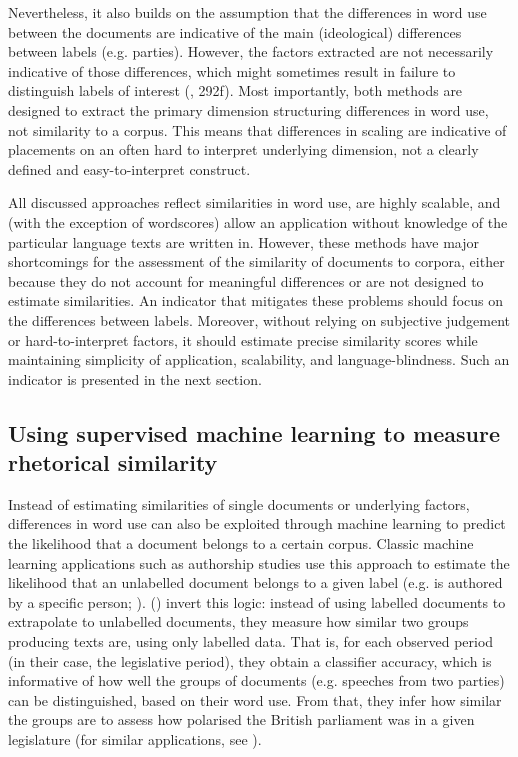 \documentclass{article}
\begin{document}
Nevertheless, it also builds on the assumption that the differences in word use between the documents are indicative of the main (ideological) differences between labels (e.g. parties). However, the factors extracted are not necessarily indicative of those differences, which might sometimes result in failure to distinguish labels of interest (\cite{Grimmer2013TextASData}, 292f). Most importantly, both methods are designed to extract the primary dimension structuring differences in word use, not similarity to a corpus. This means that differences in scaling are indicative of placements on an often hard to interpret underlying dimension, not a clearly defined and easy-to-interpret construct.\par

All discussed approaches reflect similarities in word use, are highly scalable, and (with the exception of wordscores) allow an application without knowledge of the particular language texts are written in. However, these methods have major shortcomings for the assessment of the similarity of documents to corpora, either because they do not account for meaningful differences or are not designed to estimate similarities. An indicator that mitigates these problems should focus on the differences between labels. Moreover, without relying on subjective judgement or hard-to-interpret factors, it should estimate precise similarity scores while maintaining simplicity of application, scalability, and language-blindness. Such an indicator is presented in the next section.\par

\subsection{Using supervised machine learning to measure rhetorical similarity}
\label{sec:method}

Instead of estimating similarities of single documents or underlying factors, differences in word use can also be exploited through machine learning to predict the likelihood that a document belongs to a certain corpus. Classic machine learning applications such as authorship studies use this approach to estimate the likelihood that an unlabelled document belongs to a given label (e.g. is authored by a specific person; \cite{Mosteller1963}). \citeauthor{Peterson2018} (\citeyear{Peterson2018}) invert this logic: instead of using labelled documents to extrapolate to unlabelled documents, they measure how similar two groups producing texts are, using only labelled data. That is, for each observed period (in their case, the legislative period), they obtain a classifier accuracy, which is informative of how well the groups of documents (e.g. speeches from two parties) can be distinguished, based on their word use. From that, they infer how similar the groups are to assess how polarised the British parliament was in a given legislature (for similar applications, see \cite{Gentzkow2019, Goet2019}).\par 
\end{document}
